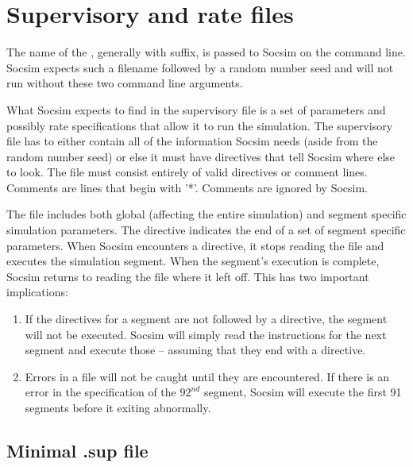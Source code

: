 
\section{Supervisory and rate files}
\label{sec:supFile}

The name of the , generally with  
suffix, is passed to Socsim on the command line.  Socsim expects such
a filename followed by a random number seed and will not run without
these two command line arguments.

What Socsim expects to find in the supervisory file is a set of
parameters and possibly rate specifications that allow it to run the
simulation.  The supervisory file has to either contain all of the
information Socsim needs (aside from the random number seed) or else
it must have  directives that tell Socsim where else to
look. The  file must consist entirely of valid directives
or comment lines. Comments are lines that begin with '*'. Comments are
ignored by Socsim.

The  file includes both global (affecting the entire
simulation) and segment specific simulation parameters.  The
 directive indicates the end of a set of segment specific
parameters.  When Socsim encounters a  directive, it stops
reading the  file and executes the simulation segment. When
the segment's execution is complete, Socsim returns to reading the
 file where it left off.  This has two important
implications:

\begin{enumerate}
\item If the directives for a  segment are not followed by a
   directive, the segment will not be executed. Socsim will
  simply read the instructions for the next segment and execute those
  -- assuming that they end with a  directive.
\item Errors in a  file will not be caught until they are
  encountered. If there is an error in the specification of the
  $92^{nd}$ segment, Socsim will execute the first 91 segments before
  it exiting abnormally.
\end{enumerate}

\subsection{Minimal .sup file}
\label{sec:minSup}

